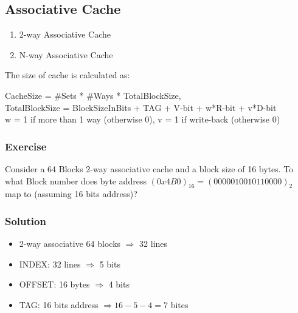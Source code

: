 \documentclass{article}
\begin{document}
\subsection{Associative Cache}
\begin{enumerate}
    \item 2-way Associative Cache
    \item N-way Associative Cache
\end{enumerate}
The size of cache is calculated as:
\begin{center}
    CacheSize = \#Sets * \#Ways * TotalBlockSize,\\
    TotalBlockSize = BlockSizeInBits + TAG + V-bit + w*R-bit + v*D-bit\\
    w = 1 if more than 1 way (otherwise 0), v = 1 if write-back (otherwise 0)
\end{center}
\subsubsection*{Exercise}
    Consider a 64 Blocks 2-way associative cache and a block size of 16 bytes. To what Block number does byte address $(0x4B0)_{16} = (0000010010110000)_2$ map to (assuming 16 bits address)?
\subsubsection*{Solution}
    \begin{itemize}
        \item 2-way associative 64 blocks $\Rightarrow$ 32 lines
        \item INDEX: 32 lines $\Rightarrow$ 5 bits
        \item OFFSET: 16 bytes $\Rightarrow$ 4 bits
        \item TAG: 16 bits address $\Rightarrow 16-5-4=7$ bites
    \end{itemize}
\end{document}
